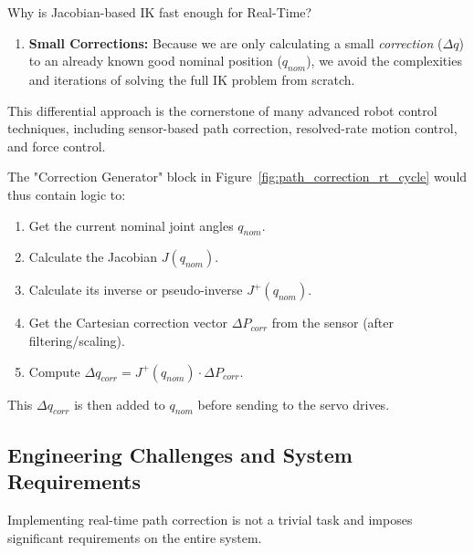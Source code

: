 \begin{principlebox}{Why is Jacobian-based IK fast enough for Real-Time?}
\begin{enumerate}
\begin{itemize}
            \end{itemize}
        \item \textbf{Small Corrections:} Because we are only calculating a small \textit{correction} (\(\Delta q\)) to an already known good nominal position (\(q_{nom}\)), we avoid the complexities and iterations of solving the full IK problem from scratch.
    \end{enumerate}
    This differential approach is the cornerstone of many advanced robot control techniques, including sensor-based path correction, resolved-rate motion control, and force control.
\end{principlebox}

The "Correction Generator" block in Figure~\ref{fig:path_correction_rt_cycle} would thus contain logic to:
\begin{enumerate}
    \item Get the current nominal joint angles \(q_{nom}\).
    \item Calculate the Jacobian \(J(q_{nom})\).
    \item Calculate its inverse or pseudo-inverse \(J^+(q_{nom})\).
    \item Get the Cartesian correction vector \(\Delta P_{corr}\) from the sensor (after filtering/scaling).
    \item Compute \(\Delta q_{corr} = J^+(q_{nom}) \cdot \Delta P_{corr}\).
\end{enumerate}
This \(\Delta q_{corr}\) is then added to \(q_{nom}\) before sending to the servo drives.

\subsection{Engineering Challenges and System Requirements}
\label{subsec:path_correction_challenges}

Implementing real-time path correction is not a trivial task and imposes significant requirements on the entire system.

